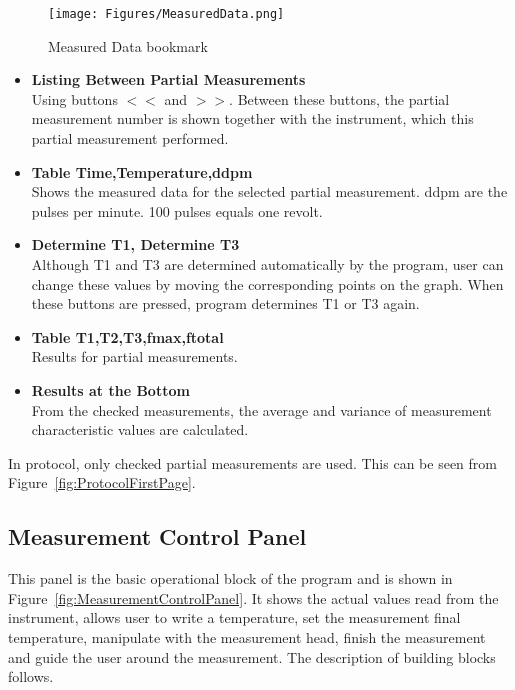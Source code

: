 \documentclass[a4paper,11pt,twoside]{book}
\theoremstyle{named}
\begin{document}
\begin{figure}[t]
  \centering
  \texttt{[image: Figures/MeasuredData.png]}
  \caption{Measured Data bookmark}
  \label{fig:MeasuredData}
\end{figure}

\begin{itemize}
  \item \textbf{Listing Between Partial Measurements} \\
    Using buttons $<<$ and $>>$. Between these buttons, the
    partial measurement number is shown together with the instrument, which
    this partial measurement performed. 
  \item \textbf{Table Time,Temperature,ddpm} \\
    Shows the measured data for the selected partial measurement. ddpm are the pulses
    per minute. 100 pulses equals one revolt. 
  \item \textbf{Determine T1, Determine T3} \\
    Although T1 and T3 are determined automatically by the program, user can
    change these values by moving the corresponding points on the graph.
    When these buttons are pressed, program determines T1 or T3 again. 
  \item \textbf{Table T1,T2,T3,fmax,ftotal} \\
    Results for partial measurements.
  \item \textbf{Results at the Bottom} \\
    From the checked measurements, the average and variance of measurement
    characteristic values are calculated.
\end{itemize}

In protocol, only checked partial measurements are used. This can be seen
from Figure~\ref{fig:ProtocolFirstPage}.

\subsection{Measurement Control Panel}
\label{sec:MeasurementControlPanel}

This panel is the basic operational block of the program and is shown in
Figure~\ref{fig:MeasurementControlPanel}. It shows the actual values read
from the instrument, allows user to write a temperature, set the measurement
final temperature, manipulate with the measurement head, finish the measurement
and guide the user around the measurement. The description of building
blocks follows.
\end{document}
